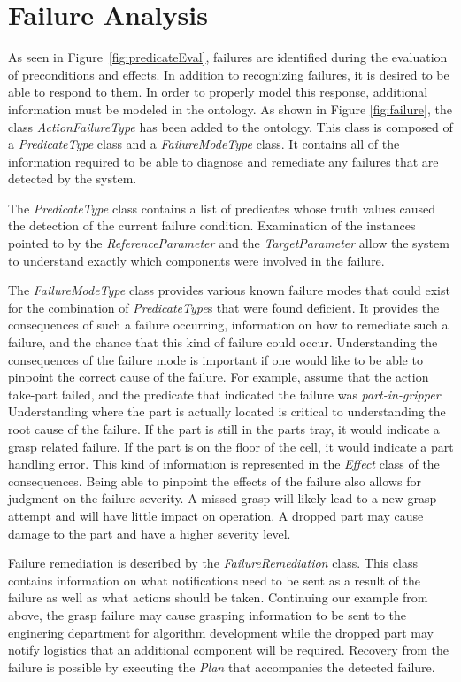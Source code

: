 \section{Failure Analysis}
As seen in Figure~\ref{fig:predicateEval}, failures are identified during the evaluation of preconditions and effects. 
In addition to recognizing failures, it is desired to be able to respond to them.
In order to properly model this response, additional information must be modeled
in the ontology. As shown in Figure \ref{fig:failure}, the class {\it ActionFailureType} has been added to the ontology. This class is composed of a {\it PredicateType} class and a {\it FailureModeType} class. It contains all of the information required to be able to diagnose and remediate any failures that are detected by the system.

The {\it PredicateType} class contains a list of predicates whose truth values caused the detection of the current failure condition. Examination of the instances pointed to by the {\it ReferenceParameter} and the {\it TargetParameter} allow the system to understand exactly which components were involved in the failure.

The {\it FailureModeType} class provides various known failure modes that could exist for the combination of {\it PredicateType}s that were found deficient. It provides the consequences of such a failure occurring, information on how to remediate such a failure, and the chance that this kind of failure could occur. Understanding the consequences of the failure mode is important if one would like to be able to
pinpoint the correct cause of the failure. For example, assume that the action {\sc take-part} failed, and the predicate that indicated the failure was {\it part-in-gripper}. Understanding where the part is actually located is critical to understanding the root cause of the failure. If the part is still in the parts tray, it would indicate a grasp related failure. If the part is on the floor of the cell, it would indicate a part handling error. This kind of information is represented in the {\it Effect} class of the consequences. Being able to pinpoint the effects of the failure also allows for judgment on the failure severity. A missed grasp will likely lead to a new grasp attempt and will have little impact on operation. A dropped part may cause damage to the part and have a higher severity level.

Failure remediation is described by the {\it FailureRemediation} class. This class contains information on what notifications need to be sent as a result of the failure as well as what actions should be taken. Continuing our example from above, the grasp failure may cause grasping information to be sent to the enginering department for algorithm development while the dropped part may notify logistics that an additional component will be required. Recovery from the failure is possible by executing the {\it Plan} that accompanies the detected failure.
